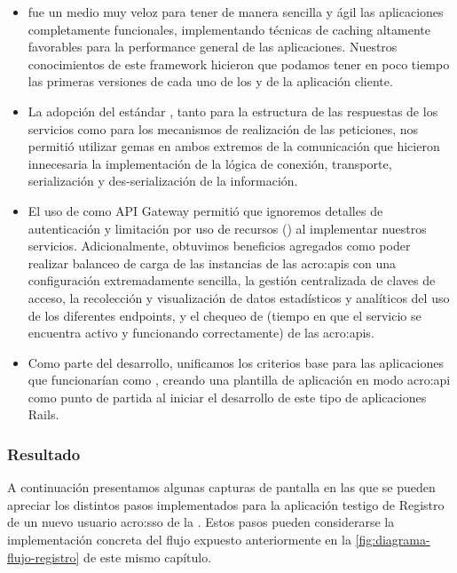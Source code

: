 \begin{itemize}
  \item {} fue un medio muy veloz para tener de manera sencilla y ágil las aplicaciones completamente funcionales, implementando técnicas de caching altamente favorables para la performance general de las aplicaciones. Nuestros conocimientos de este framework hicieron que podamos tener en poco tiempo las primeras versiones de cada uno de los  y de la aplicación cliente.

  \item La adopción del estándar , tanto para la estructura de las respuestas de los servicios como para los mecanismos de realización de las peticiones, nos permitió utilizar gemas en ambos extremos de la comunicación que hicieron innecesaria la implementación de la lógica de conexión, transporte, serialización y des-serialización de la información.

  \item El uso de  como API Gateway permitió que ignoremos detalles de autenticación y limitación por uso de recursos () al implementar nuestros servicios. Adicionalmente, obtuvimos beneficios agregados como poder realizar balanceo de carga de las instancias de las \glspl{acro:api} con una configuración extremadamente sencilla, la gestión centralizada de claves de acceso, la recolección y visualización de datos estadísticos y analíticos del uso de los diferentes endpoints, y el chequeo de  (tiempo en que el servicio se encuentra activo y funcionando correctamente) de las \glspl{acro:api}.

  \item Como parte del desarrollo, unificamos los criterios base para las aplicaciones que funcionarían como , creando una plantilla de aplicación en modo \gls{acro:api} como punto de partida al iniciar el desarrollo de este tipo de aplicaciones Rails.
\end{itemize}

\subsubsection{Resultado}

A continuación presentamos algunas capturas de pantalla en las que se pueden apreciar los distintos pasos implementados para la aplicación testigo de Registro de un nuevo usuario \gls{acro:sso} de la {\unlp}. Estos pasos pueden considerarse la implementación concreta del flujo expuesto anteriormente en la \autoref{fig:diagrama-flujo-registro} de este mismo capítulo.

